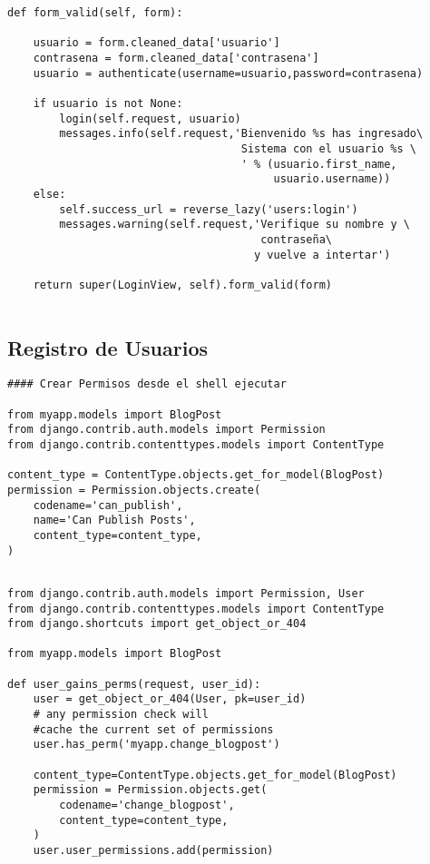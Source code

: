 \documentclass[xcolor=dvipsnames]{beamer}
\begin{document}
\begin{frame}[fragile]
\begin{verbatim}
def form_valid(self, form):
        
    usuario = form.cleaned_data['usuario']
    contrasena = form.cleaned_data['contrasena']
    usuario = authenticate(username=usuario,password=contrasena)
        
    if usuario is not None:
        login(self.request, usuario)
        messages.info(self.request,'Bienvenido %s has ingresado\
                                    Sistema con el usuario %s \
                                    ' % (usuario.first_name,
                                         usuario.username))
    else:
        self.success_url = reverse_lazy('users:login')
        messages.warning(self.request,'Verifique su nombre y \
                                       contraseña\
                                      y vuelve a intertar')

    return super(LoginView, self).form_valid(form)
 
\end{verbatim}
\end{frame}

\subsection{Registro de Usuarios}
\begin{frame}[fragile]
\begin{verbatim}
#### Crear Permisos desde el shell ejecutar

from myapp.models import BlogPost
from django.contrib.auth.models import Permission
from django.contrib.contenttypes.models import ContentType

content_type = ContentType.objects.get_for_model(BlogPost)
permission = Permission.objects.create(
    codename='can_publish',
    name='Can Publish Posts',
    content_type=content_type,
)

\end{verbatim}
\end{frame}

\begin{frame}[fragile]
\begin{verbatim}

from django.contrib.auth.models import Permission, User
from django.contrib.contenttypes.models import ContentType
from django.shortcuts import get_object_or_404

from myapp.models import BlogPost

def user_gains_perms(request, user_id):
    user = get_object_or_404(User, pk=user_id)
    # any permission check will 
    #cache the current set of permissions
    user.has_perm('myapp.change_blogpost')

    content_type=ContentType.objects.get_for_model(BlogPost)
    permission = Permission.objects.get(
        codename='change_blogpost',
        content_type=content_type,
    )
    user.user_permissions.add(permission)

\end{verbatim}
\end{frame}
\end{document}
